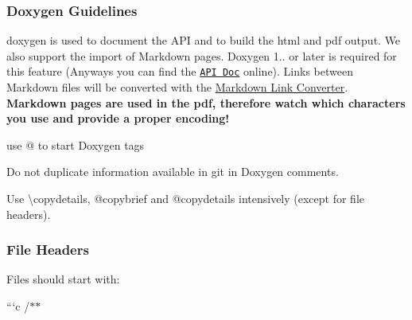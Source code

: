 \subsubsection*{Doxygen Guidelines}

{\ttfamily doxygen} is used to document the A\+PI and to build the html and pdf output. We also support the import of Markdown pages. Doxygen 1.. or later is required for this feature (Anyways you can find the \href{https://doc.libelektra.org/api/latest/html/}{\tt A\+PI Doc} online). Links between Markdown files will be converted with the \hyperlink{doc_markdownlinkconverter_README_md}{Markdown Link Converter}. {\bfseries Markdown pages are used in the pdf, therefore watch which characters you use and provide a proper encoding!}


\begin{DoxyItemize}
\item use {\ttfamily @} to start Doxygen tags
\item Do not duplicate information available in git in Doxygen comments.
\item Use {\ttfamily \textbackslash{}copydetails}, {\ttfamily @copybrief} and {\ttfamily @copydetails} intensively (except for file headers).
\end{DoxyItemize}

\subsubsection*{File Headers}

Files should start with\+:

```c /$\ast$$\ast$
\begin{DoxyItemize}
\item 
\end{DoxyItemize}